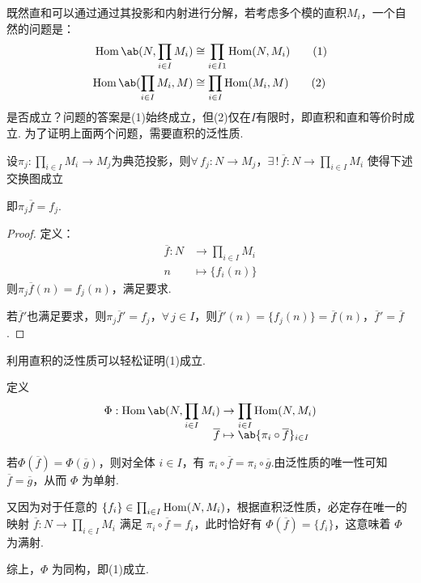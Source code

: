 既然直和可以通过通过其投影和内射进行分解，若考虑多个模的直积$M_i$，一个自然的问题是：
\begin{align*}
    \Hom\ab(N, \prod_{i\in I} M_i) &\cong \prod_{i\in I1} \Hom(N, M_i) \tag{1}\\
    \Hom\ab(\prod_{i\in I} M_i, M) &\cong \prod_{i\in I} \Hom(M_i, M) \tag{2}
\end{align*}
是否成立？问题的答案是(1)始终成立，但(2)仅在$I$有限时，即直积和直和等价时成立.
为了证明上面两个问题，需要直积的泛性质.

\begin{property}[直积的泛性质]
    设$\pi_j: \prod_{i\in I} M_i \to M_j$为典范投影，则$\forall\, f_j: N \to M_j$，$ \exists\, !\, \overline{f}: N \to \prod_{i\in I} M_i $
    使得下述交换图成立
    \begin{center}
    \end{center}
    即$\pi_j \overline{f} = f_j$.
\end{property}

\begin{proof}
    定义：
    \begin{align*}
        \overline{f}: N &\to \prod_{i\in I} M_i \\[-5pt]
        n &\mapsto \{f_i(n)\}
    \end{align*}
    则$\pi_j \overline{f}(n) = f_j(n)$，满足要求. \par
    若$\overline{f}'$也满足要求，则$\pi_j \overline{f}' = f_j$，$\forall\, j \in I$，则$\overline{f}'(n) = \{f_j(n)\} = \overline{f}(n)$，$\overline{f}' = \overline{f}$.
\end{proof}
利用直积的泛性质可以轻松证明(1)成立.\par
定义
\begin{align*}
    \Phi: \Hom\ab(N, \prod_{i\in I} M_i) &\to \prod_{i\in I} \Hom(N, M_i) \\[-5pt]
    \overline{f} &\mapsto \ab\{\pi_i \circ \overline{f}\}_{i \in I}
\end{align*}

若$\Phi(\overline{f}) = \Phi(\overline{g})$，则对全体 $i \in I$，有 $\pi_i \circ \overline{f} = \pi_i \circ \overline{g}$.由泛性质的唯一性可知 $\overline{f} = \overline{g}$，从而 $\Phi$ 为单射.\par
又因为对于任意的 $\{f_i\} \in \prod_{i\in I} \operatorname{Hom}(N, M_i)$，根据直积泛性质，必定存在唯一的映射 $\overline{f}: N \to \prod_{i\in I} M_i$ 满足 $\pi_i \circ \overline{f} = f_i$，此时恰好有 $\Phi(\overline{f}) = \{f_i\}$，这意味着 $\Phi$ 为满射.\par
综上，$\Phi$ 为同构，即(1)成立.\par

